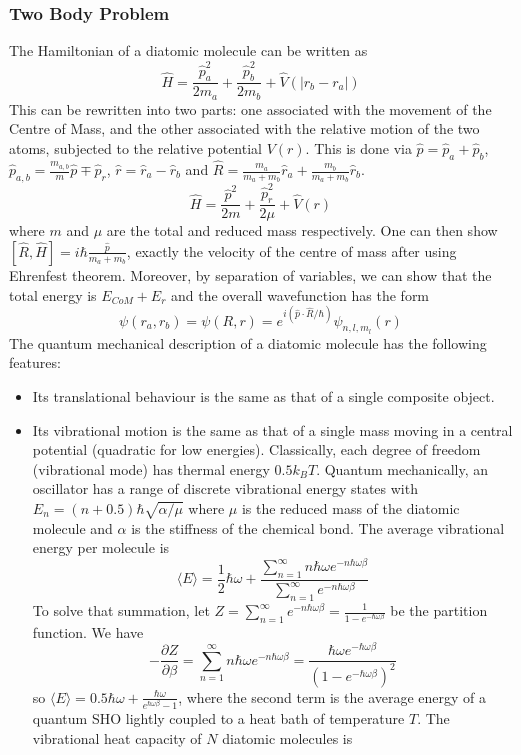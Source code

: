 \documentclass[a4paper]{article}
\begin{document}
\subsubsection*{Two Body Problem}
\begin{Note}
The Hamiltonian of a diatomic molecule can be written as
$$\hat{H}=\frac{\hat{p}_a^2}{2m_a}+\frac{\hat{p}_b^2}{2m_b}+\hat{V}(|r_b-r_a|)$$
This can be rewritten into two parts: one associated with the movement of the Centre of Mass, and the other associated with the relative motion of the two atoms, subjected to the relative potential $V(r)$. This is done via $\hat{p}=\hat{p}_a+\hat{p}_b$, $\hat{p}_{a,b}=\frac{m_{a,b}}{m}\hat{p}\mp\hat{p}_r$, $\hat{r}=\hat{r}_a-\hat{r}_b$ and $\hat{R}=\frac{m_a}{m_a+m_b}\hat{r}_a+\frac{m_b}{m_a+m_b}\hat{r}_b$.
$$\hat{H}=\frac{\hat{p}^2}{2m}+\frac{\hat{p}_r^2}{2\mu}+\hat{V}(r)$$
where $m$ and $\mu$ are the total and reduced mass respectively. One can then show $[\hat{R},\hat{H}]=i\hbar\frac{\hat{p}}{m_a+m_b}$, exactly the velocity of the centre of mass after using Ehrenfest theorem. Moreover, by separation of variables, we can show that the total energy is $E_{CoM}+E_r$ and the overall wavefunction has the form
$$\psi(r_a,r_b)=\psi(R,r)=e^{i(\hat{p}\cdot\hat{R}/\hbar)}\psi_{n,l,m_l}(r)$$
The quantum mechanical description of a diatomic molecule has the following features:
\begin{itemize}
    \item Its translational behaviour is the same as that of a single composite object.
    \item Its vibrational motion is the same as that of a single mass moving in a central potential (quadratic for low energies). Classically, each degree of freedom (vibrational mode) has thermal energy $0.5k_BT$. Quantum mechanically, an oscillator has a range of discrete vibrational energy states with $E_n=(n+0.5)\hbar\sqrt{\alpha/\mu}$ where $\mu$ is the reduced mass of the diatomic molecule and $\alpha$ is the stiffness of the chemical bond. The average vibrational energy per molecule is
$$\langle E\rangle=\frac{1}{2}\hbar\omega+\frac{\sum_{n=1}^\infty n\hbar\omega e^{-n\hbar\omega\beta}}{\sum_{n=1}^\infty e^{-n\hbar\omega\beta}}$$
To solve that summation, let $Z=\sum_{n=1}^\infty e^{-n\hbar\omega\beta}=\frac{1}{1-e^{-\hbar\omega\beta}}$ be the partition function. We have
$$-\frac{\partial Z}{\partial\beta}=\sum_{n=1}^\infty n\hbar\omega e^{-n\hbar\omega\beta}=\frac{\hbar\omega e^{-\hbar\omega\beta}}{(1-e^{-\hbar\omega\beta})^2}$$
so $\langle E\rangle=0.5\hbar\omega+\frac{\hbar\omega}{e^{\hbar\omega\beta}-1}$, where the second term is the average energy of a quantum SHO lightly coupled to a heat bath of temperature $T$. The vibrational heat capacity of $N$ diatomic molecules is

\end{itemize}
\end{Note}
\end{document}
